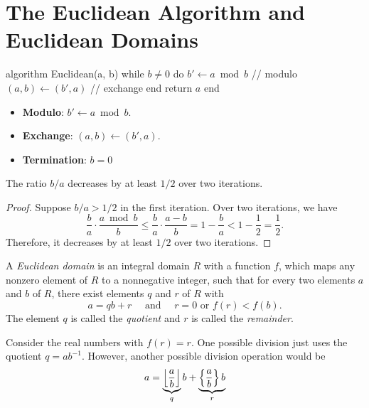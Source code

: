 \section{The Euclidean Algorithm and Euclidean Domains}

\begin{Pseudocode}
algorithm Euclidean(a, b)
  while $b ≠ 0$ do
    $b' ← a \bmod b$ // modulo
    $(a, b) ← (b', a)$ // exchange
  end
  return $a$
end
\end{Pseudocode}

\begin{itemize}
  \item \textbf{Modulo}: $b' ← a \bmod b$.
  \item \textbf{Exchange}: $(a, b) ← (b', a)$.
  \item \textbf{Termination}: $b = 0$
\end{itemize}

\begin{proposition}
  The ratio $b/a$ decreases by at least $1/2$ over two iterations.
\end{proposition}

\begin{proof}
  Suppose $b/a > 1/2$ in the first iteration.
  Over two iterations, we have
  \[
    \frac{b}{a} · \frac{a \bmod b}{b}
    ≤ \frac{b}{a} · \frac{a - b}{b}
    = 1 - \frac{b}{a}
    < 1 - \frac{1}{2}
    = \frac{1}{2}.
  \]
  Therefore, it decreases by at least $1/2$ over two iterations.
\end{proof}

\begin{definition}
  A \emph{Euclidean domain} is an integral domain $R$ with a function $f$,
  which maps any nonzero element of $R$ to a nonnegative integer,
  such that for every two elements $a$ and $b$ of $R$, there exist elements $q$ and $r$ of $R$ with
  \[
    a = qb + r \quad \text{ and } \quad r = 0 \text{ or } f(r) < f(b).
  \]
  The element $q$ is called the \emph{quotient} and $r$ is called the \emph{remainder}.
\end{definition}

\begin{example}
  Consider the real numbers with $f(r) = r$.
  One possible division just uses the quotient $q = ab^{-1}$.
  However,
  another possible division operation would be
  \[
    a = \underbrace{\left\lfloor\frac{a}{b}\right\rfloor}_q b + \underbrace{\left\{ \frac{a}{b} \right\} b}_r
  \]
\end{example}

